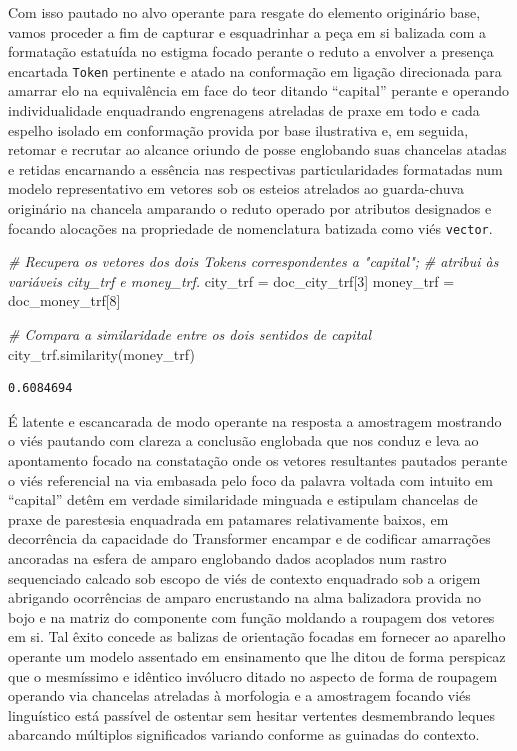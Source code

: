 \documentclass[
  brazilian,
]{article}
\newenvironment{Shaded}{}{}
\newcommand{\CommentTok}[1]{\textcolor[rgb]{0.38,0.63,0.69}{\textit{#1}}}
\newcommand{\DecValTok}[1]{\textcolor[rgb]{0.25,0.63,0.44}{#1}}
\newcommand{\NormalTok}[1]{#1}
\newcommand{\OperatorTok}[1]{\textcolor[rgb]{0.40,0.40,0.40}{#1}}
\begin{document}
Com isso pautado no alvo operante para resgate do elemento originário
base, vamos proceder a fim de capturar e esquadrinhar a peça em si
balizada com a formatação estatuída no estigma focado perante o reduto a
envolver a presença encartada \texttt{Token} pertinente e atado na
conformação em ligação direcionada para amarrar elo na equivalência em
face do teor ditando ``capital'' perante e operando individualidade
enquadrando engrenagens atreladas de praxe em todo e cada espelho
isolado em conformação provida por base ilustrativa e, em seguida,
retomar e recrutar ao alcance oriundo de posse englobando suas chancelas
atadas e retidas encarnando a essência nas respectivas particularidades
formatadas num modelo representativo em vetores sob os esteios atrelados
ao guarda-chuva originário na chancela amparando o reduto operado por
atributos designados e focando alocações na propriedade de nomenclatura
batizada como viés \texttt{vector}.

\begin{Shaded}
\begin{Highlighting}[]
\CommentTok{\# Recupera os vetores dos dois Tokens correspondentes a "capital";}
\CommentTok{\# atribui às variáveis \textquotesingle{}city\_trf\textquotesingle{} e \textquotesingle{}money\_trf\textquotesingle{}.}
\NormalTok{city\_trf }\OperatorTok{=}\NormalTok{ doc\_city\_trf[}\DecValTok{3}\NormalTok{]}
\NormalTok{money\_trf }\OperatorTok{=}\NormalTok{ doc\_money\_trf[}\DecValTok{8}\NormalTok{]}

\CommentTok{\# Compara a similaridade entre os dois sentidos de \textquotesingle{}capital\textquotesingle{}}
\NormalTok{city\_trf.similarity(money\_trf)}
\end{Highlighting}
\end{Shaded}

\begin{verbatim}
0.6084694
\end{verbatim}

É latente e escancarada de modo operante na resposta a amostragem
mostrando o viés pautando com clareza a conclusão englobada que nos
conduz e leva ao apontamento focado na constatação onde os vetores
resultantes pautados perante o viés referencial na via embasada pelo
foco da palavra voltada com intuito em ``capital'' detêm em verdade
similaridade minguada e estipulam chancelas de praxe de parestesia
enquadrada em patamares relativamente baixos, em decorrência da
capacidade do Transformer encampar e de codificar amarrações ancoradas
na esfera de amparo englobando dados acoplados num rastro sequenciado
calcado sob escopo de viés de contexto enquadrado sob a origem abrigando
ocorrências de amparo encrustando na alma balizadora provida no bojo e
na matriz do componente com função moldando a roupagem dos vetores em
si. Tal êxito concede as balizas de orientação focadas em fornecer ao
aparelho operante um modelo assentado em ensinamento que lhe ditou de
forma perspicaz que o mesmíssimo e idêntico invólucro ditado no aspecto
de forma de roupagem operando via chancelas atreladas à morfologia e a
amostragem focando viés linguístico está passível de ostentar sem
hesitar vertentes desmembrando leques abarcando múltiplos significados
variando conforme as guinadas do contexto.
\end{document}
